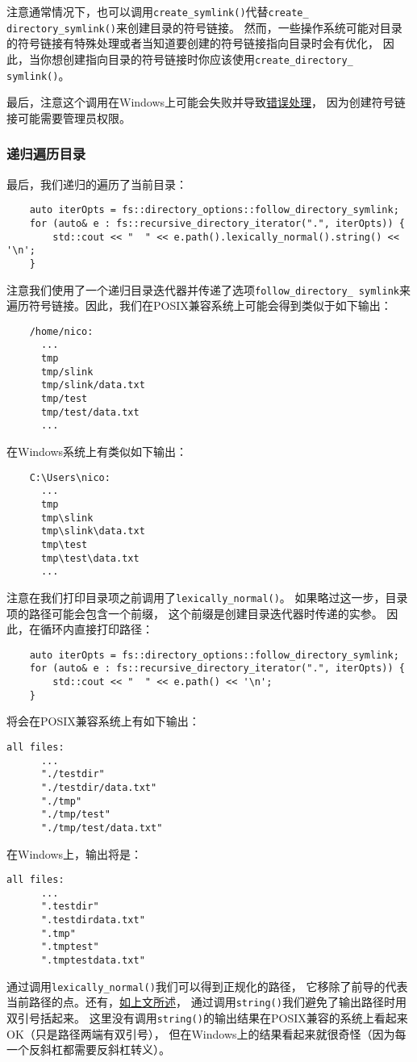 注意通常情况下，也可以调用\texttt{create\_symlink()}代替\texttt{create\_
directory\_symlink()}来创建目录的符号链接。
然而，一些操作系统可能对目录的符号链接有特殊处理或者当知道要创建的符号链接指向目录时会有优化，
因此，当你想创建指向目录的符号链接时你应该使用\texttt{create\_directory\_
symlink()}。

最后，注意这个调用在Windows上可能会失败并导致\hyperref[创建链接失败]{错误处理}，
因为创建符号链接可能需要管理员权限。

\subsubsection{递归遍历目录}
最后，我们递归的遍历了当前目录：
\begin{lstlisting}
    auto iterOpts = fs::directory_options::follow_directory_symlink;
    for (auto& e : fs::recursive_directory_iterator(".", iterOpts)) {
        std::cout << "  " << e.path().lexically_normal().string() << '\n';
    }
\end{lstlisting}
注意我们使用了一个递归目录迭代器并传递了选项\texttt{follow\_directory\_
symlink}来遍历符号链接。因此，我们在POSIX兼容系统上可能会得到类似于如下输出：
\begin{lstlisting}
    /home/nico:
      ...
      tmp
      tmp/slink
      tmp/slink/data.txt
      tmp/test
      tmp/test/data.txt
      ...
\end{lstlisting}
在Windows系统上有类似如下输出：
\begin{lstlisting}
    C:\Users\nico:
      ...
      tmp
      tmp\slink
      tmp\slink\data.txt
      tmp\test
      tmp\test\data.txt
      ...
\end{lstlisting}
注意在我们打印目录项之前调用了\texttt{lexically\_normal()}。
如果略过这一步，目录项的路径可能会包含一个前缀，
这个前缀是创建目录迭代器时传递的实参。
因此，在循环内直接打印路径：
\begin{lstlisting}
    auto iterOpts = fs::directory_options::follow_directory_symlink;
    for (auto& e : fs::recursive_directory_iterator(".", iterOpts)) {
        std::cout << "  " << e.path() << '\n';
    }
\end{lstlisting}
将会在POSIX兼容系统上有如下输出：
\begin{lstlisting}[stringstyle=\color{black}]
    all files:
      ...
      "./testdir"
      "./testdir/data.txt"
      "./tmp"
      "./tmp/test"
      "./tmp/test/data.txt"
\end{lstlisting}
在Windows上，输出将是：
\begin{lstlisting}[stringstyle=\color{black}]
    all files:
      ...
      ".testdir"
      ".testdirdata.txt"
      ".tmp"
      ".tmptest"
      ".tmptestdata.txt"
\end{lstlisting}
通过调用\texttt{lexically\_normal()}我们可以得到正规化的路径，
它移除了前导的代表当前路径的点。还有，\hyperref[ch20.1.1.1]{如上文所述}，
通过调用\texttt{string()}我们避免了输出路径时用双引号括起来。
这里没有调用\texttt{string()}的输出结果在POSIX兼容的系统上看起来OK（只是路径两端有双引号），
但在Windows上的结果看起来就很奇怪（因为每一个反斜杠都需要反斜杠转义）。

